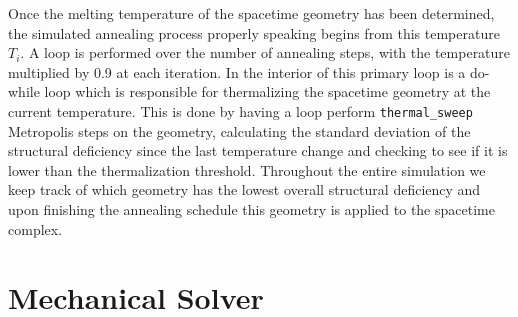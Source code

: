 \documentclass[12pt,letterpaper]{report}
\begin{document}
Once the melting temperature of the spacetime geometry has been determined, the simulated annealing 
process properly speaking begins from this temperature $T_i$. A loop is performed over the number of 
annealing steps, with the temperature multiplied by 0.9 at each iteration. In the interior of this 
primary loop is a do-while loop which is responsible for thermalizing the spacetime geometry at the 
current temperature. This is done by having a loop perform \texttt{thermal\_sweep} Metropolis steps 
on the geometry, calculating the standard deviation of the structural deficiency since the last 
temperature change and checking to see if it is lower than the thermalization threshold. Throughout 
the entire simulation we keep track of which geometry has the lowest overall structural deficiency 
and upon finishing the annealing schedule this geometry is applied to the spacetime complex.    
 
\section{Mechanical Solver}
\end{document}
